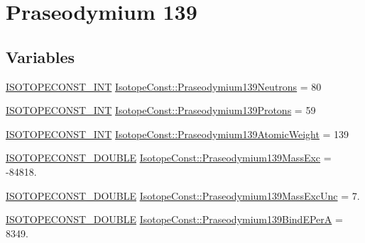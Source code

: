 \hypertarget{group___isotope_const-_praseodymium-_pr139}{}\section{Praseodymium 139}
\label{group___isotope_const-_praseodymium-_pr139}
\subsection*{Variables}
\begin{DoxyCompactItemize}
\item 
\mbox{\hyperlink{group___isotope_const-_macros_ga5f18360b3e99483a35c32d789e62621c}{I\+S\+O\+T\+O\+P\+E\+C\+O\+N\+S\+T\+\_\+\+I\+NT}} \mbox{\hyperlink{group___isotope_const-_praseodymium-_pr139_ga9f424441da53c911030f522df84c8784}{Isotope\+Const\+::\+Praseodymium139\+Neutrons}} = 80
\item 
\mbox{\hyperlink{group___isotope_const-_macros_ga5f18360b3e99483a35c32d789e62621c}{I\+S\+O\+T\+O\+P\+E\+C\+O\+N\+S\+T\+\_\+\+I\+NT}} \mbox{\hyperlink{group___isotope_const-_praseodymium-_pr139_ga65e77beaf64924d90e87d234a78cff5c}{Isotope\+Const\+::\+Praseodymium139\+Protons}} = 59
\item 
\mbox{\hyperlink{group___isotope_const-_macros_ga5f18360b3e99483a35c32d789e62621c}{I\+S\+O\+T\+O\+P\+E\+C\+O\+N\+S\+T\+\_\+\+I\+NT}} \mbox{\hyperlink{group___isotope_const-_praseodymium-_pr139_gaae0594f3c9601ec75b3d0da1b0f5ea44}{Isotope\+Const\+::\+Praseodymium139\+Atomic\+Weight}} = 139
\item 
\mbox{\hyperlink{group___isotope_const-_macros_ga8f45a7272ce02c0b4c65c44636ed719a}{I\+S\+O\+T\+O\+P\+E\+C\+O\+N\+S\+T\+\_\+\+D\+O\+U\+B\+LE}} \mbox{\hyperlink{group___isotope_const-_praseodymium-_pr139_ga40bb93d2b8d873d0b50d965f37d22656}{Isotope\+Const\+::\+Praseodymium139\+Mass\+Exc}} = -\/84818.
\item 
\mbox{\hyperlink{group___isotope_const-_macros_ga8f45a7272ce02c0b4c65c44636ed719a}{I\+S\+O\+T\+O\+P\+E\+C\+O\+N\+S\+T\+\_\+\+D\+O\+U\+B\+LE}} \mbox{\hyperlink{group___isotope_const-_praseodymium-_pr139_ga5c49b945affda294907d7e503464f205}{Isotope\+Const\+::\+Praseodymium139\+Mass\+Exc\+Unc}} = 7.
\item 
\mbox{\hyperlink{group___isotope_const-_macros_ga8f45a7272ce02c0b4c65c44636ed719a}{I\+S\+O\+T\+O\+P\+E\+C\+O\+N\+S\+T\+\_\+\+D\+O\+U\+B\+LE}} \mbox{\hyperlink{group___isotope_const-_praseodymium-_pr139_ga1ad2af1c3d3e0ddf4cc6dc222150422c}{Isotope\+Const\+::\+Praseodymium139\+Bind\+E\+PerA}} = 8349.

\end{DoxyCompactItemize}

